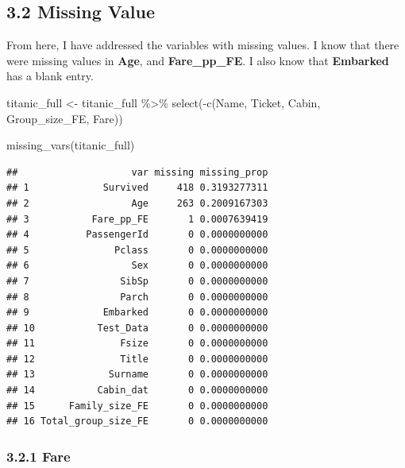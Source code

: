 \documentclass[
]{article}
\newenvironment{Shaded}{\begin{snugshade}}{\end{snugshade}}
\newcommand{\FunctionTok}[1]{\textcolor[rgb]{0.00,0.00,0.00}{#1}}
\newcommand{\NormalTok}[1]{#1}
\newcommand{\OtherTok}[1]{\textcolor[rgb]{0.56,0.35,0.01}{#1}}
\newcommand{\SpecialCharTok}[1]{\textcolor[rgb]{0.00,0.00,0.00}{#1}}
\begin{document}
\hypertarget{missing-value}{%
\subsection{\texorpdfstring{\textbf{3.2 Missing
Value}}{3.2 Missing Value}}\label{missing-value}}

From here, I have addressed the variables with missing values. I know
that there were missing values in \textbf{Age}, and
\textbf{Fare\_pp\_FE}. I also know that \textbf{Embarked} has a blank
entry.

\begin{Shaded}
\begin{Highlighting}[]
\NormalTok{titanic\_full }\OtherTok{\textless{}{-}}\NormalTok{ titanic\_full }\SpecialCharTok{\%\textgreater{}\%}
  \FunctionTok{select}\NormalTok{(}\SpecialCharTok{{-}}\FunctionTok{c}\NormalTok{(Name, Ticket, Cabin, Group\_size\_FE, Fare))}

\FunctionTok{missing\_vars}\NormalTok{(titanic\_full)}
\end{Highlighting}
\end{Shaded}

\begin{verbatim}
##                    var missing missing_prop
## 1             Survived     418 0.3193277311
## 2                  Age     263 0.2009167303
## 3           Fare_pp_FE       1 0.0007639419
## 4          PassengerId       0 0.0000000000
## 5               Pclass       0 0.0000000000
## 6                  Sex       0 0.0000000000
## 7                SibSp       0 0.0000000000
## 8                Parch       0 0.0000000000
## 9             Embarked       0 0.0000000000
## 10           Test_Data       0 0.0000000000
## 11               Fsize       0 0.0000000000
## 12               Title       0 0.0000000000
## 13             Surname       0 0.0000000000
## 14           Cabin_dat       0 0.0000000000
## 15      Family_size_FE       0 0.0000000000
## 16 Total_group_size_FE       0 0.0000000000
\end{verbatim}

\hypertarget{fare-1}{%
\subsubsection{\texorpdfstring{\textbf{3.2.1
Fare}}{3.2.1 Fare}}\label{fare-1}}

\begin{Shaded}
\end{Shaded}
\end{document}
